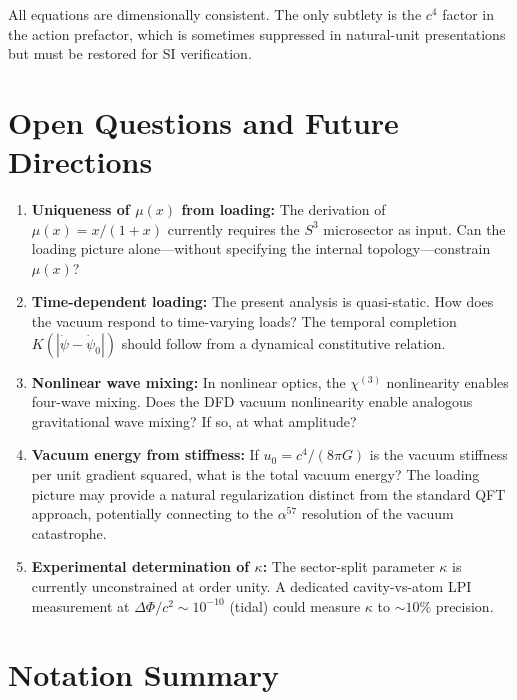 \documentclass[11pt]{article}
\begin{document}
All equations are dimensionally consistent. The only subtlety is the
$c^4$ factor in the action prefactor, which is sometimes suppressed
in natural-unit presentations but must be restored for SI verification.

\section{Open Questions and Future Directions}
\label{sec:open}

\begin{enumerate}
\item \textbf{Uniqueness of $\mu(x)$ from loading:}
The derivation of $\mu(x) = x/(1+x)$ currently requires the
$S^3$ microsector as input.  Can the loading picture alone---without
specifying the internal topology---constrain $\mu(x)$?

\item \textbf{Time-dependent loading:}
The present analysis is quasi-static.  How does the vacuum respond
to time-varying loads?  The temporal completion
$K(|\dot\psi - \dot\psi_0|)$ should follow from a dynamical
constitutive relation.

\item \textbf{Nonlinear wave mixing:}
In nonlinear optics, the $\chi^{(3)}$ nonlinearity enables
four-wave mixing.  Does the DFD vacuum nonlinearity enable
analogous gravitational wave mixing?  If so, at what amplitude?

\item \textbf{Vacuum energy from stiffness:}
If $u_0 = c^4/(8\pi G)$ is the vacuum stiffness per unit gradient
squared, what is the total vacuum energy?  The loading picture may
provide a natural regularization distinct from the standard QFT
approach, potentially connecting to the $\alpha^{57}$ resolution
of the vacuum catastrophe.

\item \textbf{Experimental determination of $\kappa$:}
The sector-split parameter $\kappa$ is currently unconstrained at
order unity.  A dedicated cavity-vs-atom LPI measurement at
$\Delta\Phi/c^2 \sim 10^{-10}$ (tidal) could measure $\kappa$ to
$\sim 10\%$ precision.
\end{enumerate}

\section*{Notation Summary}
\end{document}
